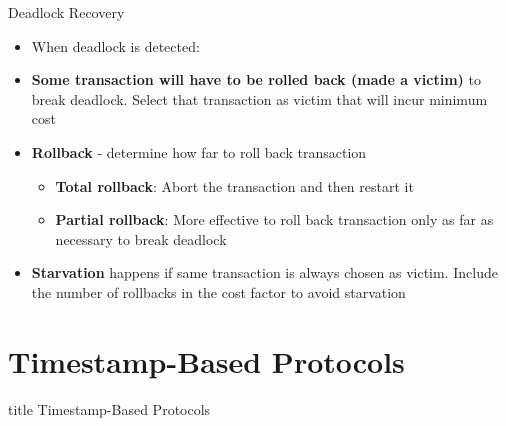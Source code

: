 \documentclass[aspectratio=169, xcolor=dvipsnames]{beamer}
\begin{document}
\begin{frame}{Deadlock Recovery}
    \begin{itemize}[<+->]
        \item When deadlock is detected:
        \item \textbf{Some transaction will have to be rolled back (made a victim)} to break deadlock. Select that transaction as victim that will incur minimum cost
        \item \textbf{Rollback} - determine how far to roll back transaction
        \begin{itemize}
            \item[$\triangleright$] \textbf{Total rollback}: Abort the transaction and then restart it
            \item[$\triangleright$] \textbf{Partial rollback}: More effective to roll back transaction only as far as necessary to break deadlock
        \end{itemize}
        \item \textbf{Starvation} happens if same transaction is always chosen as victim. Include the number of rollbacks in the cost factor to avoid starvation
    \end{itemize}
\end{frame}

\section{Timestamp-Based Protocols}

\begin{frame}
  \vfill
  \centering
  \begin{beamercolorbox}[sep=8pt,center,shadow=true,rounded=true]{title}
    Timestamp-Based Protocols\par%
  \end{beamercolorbox}
  \vfill
\end{frame}
\end{document}

